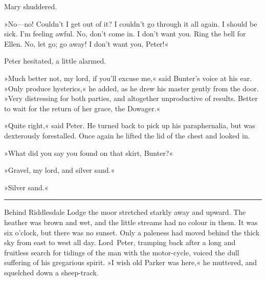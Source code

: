 Mary shuddered.

»No—no! Couldn't I get out of it? I couldn't go through it all again.  I should be sick. I'm feeling awful. No, don't come in. I don't want you. Ring the bell for Ellen. No, let go; go away! I don't want you, Peter!«

Peter hesitated, a little alarmed.

»Much better not, my lord, if you'll excuse me,« said Bunter's voice at his ear. »Only produce hysterics,« he added, as he drew his master gently from the door. »Very distressing for both parties, and altogether unproductive of results. Better to wait for the return of her grace, the Dowager.«

»Quite right,« said Peter. He turned back to pick up his paraphernalia, but was dexterously forestalled. Once again he lifted the lid of the chest and looked in.

»What did you say you found on that skirt, Bunter?«

»Gravel, my lord, and silver sand.«

»Silver sand.«

\noindent\hfil\rule{0.5\textwidth}{.4pt}\hfil

Behind Riddlesdale Lodge the moor stretched starkly away and upward.  The heather was brown and wet, and the little streams had no colour in them. It was six o'clock, but there was no sunset. Only a paleness had moved behind the thick sky from east to west all day. Lord~Peter, tramping back after a long and fruitless search for tidings of the man with the motor-cycle, voiced the dull suffering of his gregarious spirit. »I wish old Parker was here,« he muttered, and squelched down a sheep-track.

